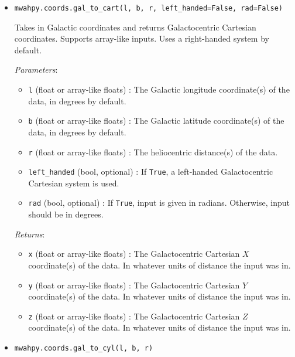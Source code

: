 \documentclass{article}
\begin{document}
\begin{itemize}
\item \verb!mwahpy.coords.gal_to_cart(l, b, r, left_handed=False, rad=False)!

Takes in Galactic coordinates and returns Galactocentric Cartesian coordinates. Supports array-like inputs. Uses a right-handed system by default.

\textit{Parameters}: \begin{itemize}

\item \verb!l! (float or array-like floats) : The Galactic longitude coordinate(s) of the data, in degrees by default.

\item \verb!b! (float or array-like floats) : The Galactic latitude coordinate(s) of the data, in degrees by default.

\item \verb!r! (float or array-like floats) : The heliocentric distance(s) of the data.

\item \verb!left_handed! (bool, optional) : If \verb!True!, a left-handed Galactocentric Cartesian system is used.

\item \verb!rad! (bool, optional) : If \verb!True!, input is given in radians. Otherwise, input should be in degrees.

\end{itemize}

\textit{Returns}: \begin{itemize}

\item \verb!x! (float or array-like floats) : The Galactocentric Cartesian $X$ coordinate(s) of the data. In whatever units of distance the input was in.

\item \verb!y! (float or array-like floats) : The Galactocentric Cartesian $Y$ coordinate(s) of the data. In whatever units of distance the input was in.

\item \verb!z! (float or array-like floats) : The Galactocentric Cartesian $Z$ coordinate(s) of the data. In whatever units of distance the input was in.

\end{itemize}



\item \verb!mwahpy.coords.gal_to_cyl(l, b, r)!


\end{itemize}
\end{document}
